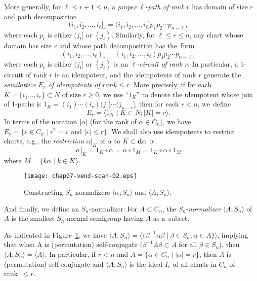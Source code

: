 \documentclass{surv-l}
\numberwithin{equation}{section}
\numberwithin{table}{section}
\numberwithin{figure}{section}
\theoremstyle{definition}
\begin{document}
More generally, for $\ell\leq r+1 \leq n$, a \emph{proper}
$\ell$-\emph{path of rank} $r$ has domain of size $r$ and path
decomposition
\[
(i_{1}, i_{2},\ldots, i_{\ell}]_{r}=(i_{1}, i_{2},\ldots, i_{\ell}]p_{1}p_{2}\cdots p_{n-\ell},
\]
where each $p_{t}$ is either $(j_{t}]$ or $(j_{t})$. Similarly,
for $\ell\leq r\leq n$, any chart whose domain has size $r$ and
whose path decomposition has the~form
\[
(i_{1}, i_{2},\ldots, i_{\ell})_{r}=(i_{1}, i_{2},\ldots, i_{\ell})p_{1}p_{2}\cdots p_{n-\ell},
\]
where each $p_{t}$ is either $(j_{t}]$ or $(j_{t})$ is an
$\ell$-\emph{circuit of rank} $r$. In particular, a 1-circuit of
rank $r$ is an idempotent, and the idempotents of rank $r$
generate the \emph{semilattice} $E_{r}$ \emph{of idempotents of}
$rank\leq r$. More precisely, if for each $K=\{i_{1}\ldots,
i_{r}\}\subset N$ of size $r\geq 0$, we use ``$1_{K}$'' to denote
the idempotent whose join of 1-paths is
$1_{K}=(i_{1})\cdots(i_{r})(j_{1}]\cdots(j_{n-r}]$, then for each
$r<n$, we~define
\begin{equation}\label{eq7.28.3}
E_{r}=\langle 1_{K}\mid K\subset N;|K|=r\rangle.
\end{equation}
In terms of the notation $|\alpha|$ (for the rank of $\alpha\in
C_{n}$), we have $E_{r}=\{\varepsilon \in
C_{n} \mid \varepsilon^{2}=\varepsilon$ and $|\varepsilon|\leq
r\}$. We shall also use idempotents to restrict charts, e.g., the
\emph{restriction} $\alpha|_{K}$ of $\alpha$ to $K\subset
\mathbf{d}\alpha$~is
\begin{equation}\label{eq7.28.4}
 \alpha|_{K}=1_{K}\circ\alpha=\alpha \circ 1_{M}=1_{K}\circ\alpha\circ 1_{M}
\end{equation}
where $M=\{k\alpha \mid k\in K\}$.

\setcounter{figure}{4}
\begin{figure}[!h]
\texttt{[image: chap07-vend-scan-02.eps]}
\caption{Constructing $S_{n}$-normalizers $\langle\alpha;S_{n}\rangle$ and
$\langle A;S_{n}\rangle$.\label{fig7.28.5}}
\end{figure}

And finally, we define an $S_{n}$-normalizer: For $A\subset
C_{n}$, the $S_{n}$-\emph{normalizer} $\langle A;S_{n}\rangle$ of
$A$ is the smallest $S_{n}$-normal semigroup having $A$ as
a~subset.

As indicated in Figure~\ref{fig7.28.5}, we have $\langle
A;S_{n}\rangle=\langle\{\beta^{-1}\alpha\beta \mid \beta\in
S_{n};\alpha\in  A\}\rangle$, implying that when A is
(permutation) self-conjugate $(\beta^{-1}A\beta\subset A$ for all
$\beta\in S_{n}$), then $\langle A;S_{n}\rangle=\langle A\rangle$.
In particular, if $r<n$ and $A=\{\alpha\in C_{n} \mid
|\alpha|=r\}$, then $A$ is (permutation) self-conjugate and
$\langle A;S_{n}\rangle$ is the ideal $I_{r}$ of all charts in
$C_{n}$ of rank~$\leq r$.
\end{document}
